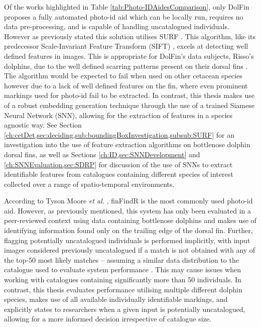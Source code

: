 Of the works highlighted in Table \ref{tab:Photo-IDAidesComparison}, only DolFin \cite{maglietta_dolfin_2018} proposes a fully automated photo-id aid which can be locally run, requires no data pre-processing, and is capable of handling uncatalogued individuals. However as previously stated this solution utilises SURF \cite{bay_speeded-up_2008}. This algorithm, like its predecessor Scale-Invariant Feature Transform (SIFT) \cite{lowe_object_1999}, excels at detecting well defined features in images. This is appropriate for DolFin's data subjects, Risso's dolphins, due to the well defined scarring patterns present on their dorsal fins \cite{mariani_analysis_2016}. The algorithm would be expected to fail when used on other cetacean species however due to a lack of well defined features on the fin, where even prominent markings used for photo-id fail to be extracted. In contrast, this thesis makes use of a robust embedding generation technique through the use of a trained Siamese Neural Network (SNN), allowing for the extraction of features in a species agnostic way. See Section \ref{ch:cetDet,sec:deciding,sub:boundingBoxInvestigation,subsub:SURF} for an investigation into the use of feature extraction algorithms on bottlenose dolphin dorsal fins, as well as Sections \ref{ch:ID,sec:SNNDevelopment} and \ref{ch:SNNEvaluation,sec:SDRP} for discussion of the use of SNNs to extract identifiable features from catalogues containing different species of interest collected over a range of spatio-temporal environments. 
 
According to Tyson Moore \textit{et al.} \cite{tyson_moore_rise_2022}, finFindR is the most commonly used photo-id aid. However, as previously mentioned, this system has only been evaluated in a peer-reviewed context using data containing bottlenose dolphins and makes use of identifying information found only on the trailing edge of the dorsal fin. Further, flagging potentially uncatalogued individuals is performed implicitly, with input images considered previously uncatalogued if a match is not obtained with any of the top-50 most likely matches -- assuming a similar data distribution to the catalogue used to evaluate system performance \cite{thompson_finfindr_2022}. This may cause issues when working with catalogues containing significantly more than 50 individuals. In contrast, this thesis evaluates performance utilising multiple different dolphin species, makes use of all available individually identifiable markings, and explicitly states to researchers when a given input is potentially uncatalogued, allowing for a more informed decision irrespective of catalogue size.

